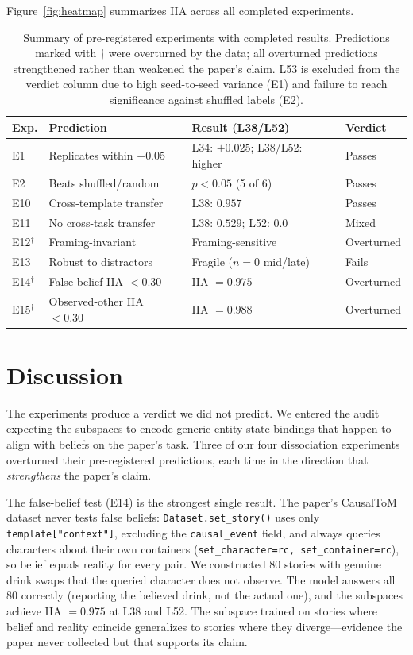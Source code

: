 \documentclass[11pt]{article}
\begin{document}
Figure~\ref{fig:heatmap} summarizes IIA across all completed experiments.

\begin{table}[t]
\centering
\caption{Summary of pre-registered experiments with completed results. Predictions marked with $\dagger$ were overturned by the data; all overturned predictions strengthened rather than weakened the paper's claim. L53 is excluded from the verdict column due to high seed-to-seed variance (E1) and failure to reach significance against shuffled labels (E2).}
\label{tab:summary}
\begin{tabular}{lp{3.2cm}p{3.2cm}l}
\toprule
\textbf{Exp.} & \textbf{Prediction} & \textbf{Result (L38/L52)} & \textbf{Verdict} \\
\midrule
E1 & Replicates within $\pm 0.05$ & L34: $+0.025$; L38/L52: higher & Passes \\
E2 & Beats shuffled/random & $p < 0.05$ (5 of 6) & Passes \\
E10 & Cross-template transfer & L38: $0.957$ & Passes \\
E11 & No cross-task transfer & L38: $0.529$; L52: $0.0$ & Mixed \\
E12$^\dagger$ & Framing-invariant & Framing-sensitive & Overturned \\
E13 & Robust to distractors & Fragile ($n=0$ mid/late) & Fails \\
E14$^\dagger$ & False-belief IIA $< 0.30$ & IIA $= 0.975$ & Overturned \\
E15$^\dagger$ & Observed-other IIA $< 0.30$ & IIA $= 0.988$ & Overturned \\
\bottomrule
\end{tabular}
\end{table}


\section{Discussion}
\label{sec:discussion}

The experiments produce a verdict we did not predict. We entered the audit expecting the subspaces to encode generic entity-state bindings that happen to align with beliefs on the paper's task. Three of our four dissociation experiments overturned their pre-registered predictions, each time in the direction that \emph{strengthens} the paper's claim.

The false-belief test (E14) is the strongest single result. The paper's CausalToM dataset never tests false beliefs: \texttt{Dataset.set\_story()} uses only \texttt{template["context"]}, excluding the \texttt{causal\_event} field, and always queries characters about their own containers (\texttt{set\_character=rc, set\_container=rc}), so belief equals reality for every pair. We constructed 80 stories with genuine drink swaps that the queried character does not observe. The model answers all 80 correctly (reporting the believed drink, not the actual one), and the subspaces achieve IIA $= 0.975$ at L38 and L52. The subspace trained on stories where belief and reality coincide generalizes to stories where they diverge---evidence the paper never collected but that supports its claim.
\end{document}
